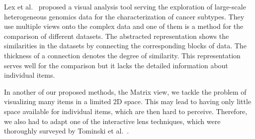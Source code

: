 \documentclass{bmcart}
\def\MatView {Matrix view\xspace}
\begin{document}

Lex et al.~\cite{Lex2012} proposed a visual analysis tool serving the exploration of large-scale heterogeneous genomics data for the characterization of cancer subtypes.
They use multiple views onto the complex data and one of them is a method for the comparison of different datasets.
The abstracted representation shows the similarities in the datasets by connecting the corresponding blocks of data. 
The thickness of a connection denotes the degree of similarity. 
This representation serves well for the comparison but it lacks the detailed information about individual items.

In another of our proposed methods, the \MatView, we tackle the problem of visualizing many items in a limited 2D space.
This may lead to having only little space available for individual items, which are then hard to perceive.
Therefore, we also had to adapt one of the interactive lens techniques, which were thoroughly surveyed by Tominski et al.~\cite{Tominski2014}.
\end{document}
